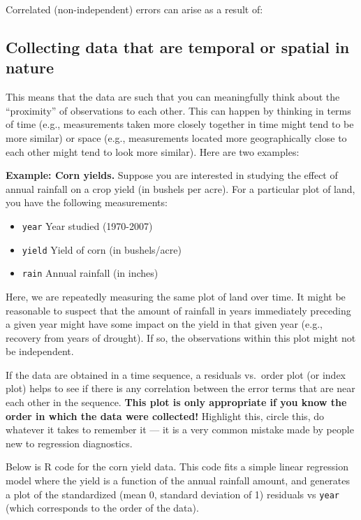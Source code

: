 \documentclass[
]{book}
\providecommand{\tightlist}{%
  \setlength{\itemsep}{0pt}\setlength{\parskip}{0pt}}
\begin{document}
Correlated (non-independent) errors can arise as a result of:

\hypertarget{collecting-data-that-are-temporal-or-spatial-in-nature}{%
\subsection{Collecting data that are temporal or spatial in nature}\label{collecting-data-that-are-temporal-or-spatial-in-nature}}

This means that the data are such that you can meaningfully think about the ``proximity'' of observations to each other. This can happen by thinking in terms of time (e.g., measurements taken more closely together in time might tend to be more similar) or space (e.g., measurements located more geographically close to each other might tend to look more similar). Here are two examples:

\textbf{Example: Corn yields.} Suppose you are interested in studying the effect of annual rainfall on a crop yield (in bushels per acre). For a particular plot of land, you have the following measurements:

\begin{itemize}
\tightlist
\item
  \texttt{year} Year studied (1970-2007)
\item
  \texttt{yield} Yield of corn (in bushels/acre)
\item
  \texttt{rain} Annual rainfall (in inches)
\end{itemize}

Here, we are repeatedly measuring the same plot of land over time. It might be reasonable to suspect that the amount of rainfall in years immediately preceding a given year might have some impact on the yield in that given year (e.g., recovery from years of drought). If so, the observations within this plot might not be independent.

If the data are obtained in a time sequence, a residuals vs.~order plot (or index plot) helps to see if there is any correlation between the error terms that are near each other in the sequence. \textbf{This plot is only appropriate if you know the order in which the data were collected!} Highlight this, circle this, do whatever it takes to remember it --- it is a very common mistake made by people new to regression diagnostics.

Below is R code for the corn yield data. This code fits a simple linear regression model where the yield is a function of the annual rainfall amount, and generates a plot of the standardized (mean 0, standard deviation of 1) residuals vs \texttt{year} (which corresponds to the order of the data).
\end{document}
